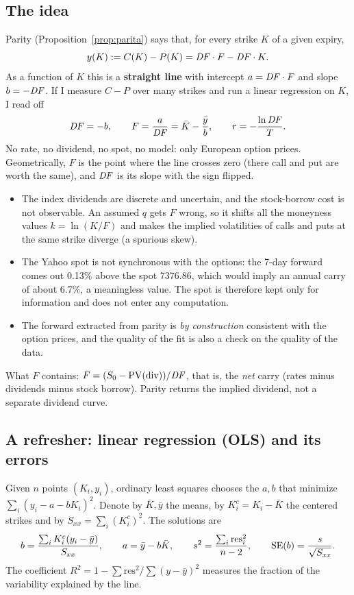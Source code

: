 \subsection{The idea}
Parity (Proposition~\ref{prop:parita}) says that, for every strike $K$ of a given expiry,
\begin{equation}\label{eq:parita-regressione}
y(K):=C(K)-P(K)=\mathit{DF}\cdot F-\mathit{DF}\cdot K .
\end{equation}
As a function of $K$ this is a \textbf{straight line} with intercept $a=\mathit{DF}\cdot F$ and slope $b=-\mathit{DF}$. If I measure
$C-P$ over many strikes and run a linear regression on $K$, I read off
\begin{equation}\label{eq:F-DF-da-retta}
\mathit{DF}=-b,\qquad F=\frac{a}{\mathit{DF}}=\bar K-\frac{\bar y}{b},\qquad r=-\frac{\ln\mathit{DF}}{T}.
\end{equation}
No rate, no dividend, no spot, no model: only European option prices. Geometrically, $F$ is the point where the line
crosses zero (there call and put are worth the same), and $\mathit{DF}$ is its slope with the sign flipped.

\begin{perche}[title={Why not simply use spot, rate and dividend?}]
\begin{itemize}
\item The index dividends are discrete and uncertain, and the stock-borrow cost is not observable. An assumed $q$
gets $F$ wrong, so it shifts all the moneyness values $k=\ln(K/F)$ and makes the implied volatilities of calls and
puts at the same strike diverge (a spurious skew).
\item The Yahoo spot is not synchronous with the options: the 7-day forward comes out 0.13\% above the spot 7376.86,
which would imply an annual carry of about 6.7\%, a meaningless value. The spot is therefore kept only for
information and does not enter any computation.
\item The forward extracted from parity is \emph{by construction} consistent with the option prices, and the quality
of the fit is also a check on the quality of the data.
\end{itemize}
What $F$ contains: $F=(S_0-\mathrm{PV}(\text{div}))/\mathit{DF}$, that is, the \emph{net} carry (rates minus dividends minus
stock borrow). Parity returns the implied dividend, not a separate dividend curve.
\end{perche}

\subsection{A refresher: linear regression (OLS) and its errors}
Given $n$ points $(K_i,y_i)$, ordinary least squares chooses the $a,b$ that minimize $\sum_i(y_i-a-bK_i)^2$. Denote by
$\bar K,\bar y$ the means, by $K_i^c=K_i-\bar K$ the centered strikes and by $S_{xx}=\sum_i(K^c_i)^2$. The solutions
are
\begin{equation}\label{eq:ols}
b=\frac{\sum_iK^c_i(y_i-\bar y)}{S_{xx}},\qquad a=\bar y-b\bar K,\qquad
s^2=\frac{\sum_i\text{res}_i^2}{n-2},\qquad \mathrm{SE}(b)=\frac{s}{\sqrt{S_{xx}}}.
\end{equation}
The coefficient $R^2=1-\sum\text{res}^2/\sum(y-\bar y)^2$ measures the fraction of the variability explained by the
line.

